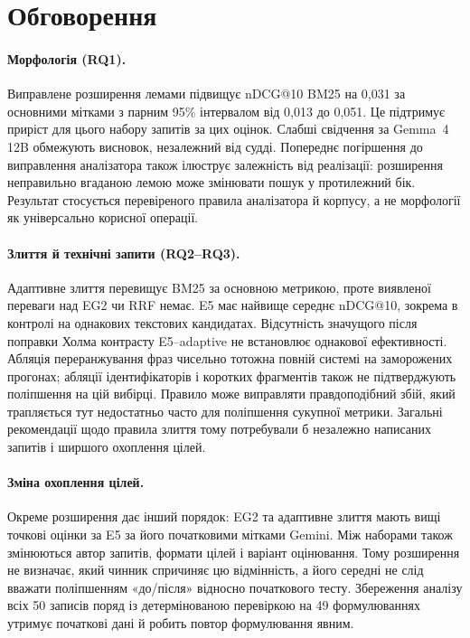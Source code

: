 \section{Обговорення}\label{sec:discussion}

\paragraph{Морфологія (RQ1).}
Виправлене розширення лемами підвищує nDCG@10 BM25 на 0,031 за основними мітками з парним 95\% інтервалом від 0,013 до 0,051. Це підтримує приріст для цього набору запитів за цих оцінок. Слабші свідчення за Gemma~4 12B обмежують висновок, незалежний від судді. Попереднє погіршення до виправлення аналізатора також ілюструє залежність від реалізації: розширення неправильно вгаданою лемою може змінювати пошук у протилежний бік. Результат стосується перевіреного правила аналізатора й корпусу, а не морфології як універсально корисної операції.

\paragraph{Злиття й технічні запити (RQ2--RQ3).}
Адаптивне злиття перевищує BM25 за основною метрикою, проте виявленої переваги над EG2 чи RRF немає. E5 має найвище середнє nDCG@10, зокрема в контролі на однакових текстових кандидатах. Відсутність значущого після поправки Холма контрасту E5--adaptive не встановлює однакової ефективності. Абляція переранжування фраз чисельно тотожна повній системі на заморожених прогонах; абляції ідентифікаторів і коротких фрагментів також не підтверджують поліпшення на цій вибірці. Правило може виправляти правдоподібний збій, який трапляється тут недостатньо часто для поліпшення сукупної метрики. Загальні рекомендації щодо правила злиття тому потребували б незалежно написаних запитів і ширшого охоплення цілей.

\paragraph{Зміна охоплення цілей.}
Окреме розширення дає інший порядок: EG2 та адаптивне злиття мають вищі точкові оцінки за E5 за його початковими мітками Gemini. Між наборами також змінюються автор запитів, формати цілей і варіант оцінювання. Тому розширення не визначає, який чинник спричиняє цю відмінність, а його середні не слід вважати поліпшенням «до/після» відносно початкового тесту. Збереження аналізу всіх 50 записів поряд із детермінованою перевіркою на 49 формулюваннях утримує початкові дані й робить повтор формулювання явним.

